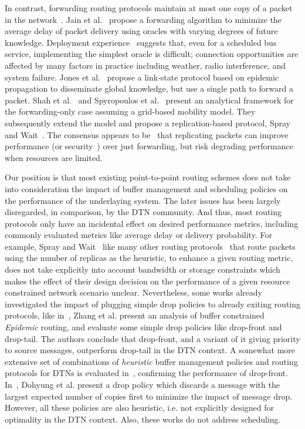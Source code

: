 In contrast, forwarding routing protocols maintain at most one copy of a packet in the network~\cite{Fall:DTNrouting,Waterloo:wdtn,akis:technical1}. Jain et
al.~\cite{Fall:DTNrouting} propose a forwarding algorithm to minimize the average delay of packet delivery using oracles with varying
degrees of future knowledge. Deployment experience~\cite{BalasubramanianLV07} suggests that, even for a scheduled bus service, implementing
the simplest oracle is difficult; connection opportunities are affected by many factors in practice including weather, radio
interference, and system failure. Jones et al.~\cite{Waterloo:wdtn} propose a link-state protocol based on
epidemic propagation to disseminate global knowledge, but use a single path to forward a packet. Shah et al.~\cite{Shah:datamules} and
Spyropoulos et al.~\cite{akis:technical1} present an analytical framework for
the forwarding-only case assuming a grid-based mobility model. They subsequently extend the model and propose a
replication-based protocol, Spray and Wait~\cite{akis:wdtn}. The consensus appears to be~\cite{akis:wdtn} that replicating packets can improve
performance (or security~\cite{Levine:Mobihoc07}) over just forwarding, but risk degrading performance when resources are limited.

Our position is that most existing point-to-point routing schemes does not take into consideration the impact of buffer management and scheduling policies on the performance of the underlaying system. The later issues has been largely disregarded, in comparison, by the DTN community. And thus, most routing protocols only have an incidental effect on desired performance metrics, including commonly evaluated metrics like average delay or delivery probability. For example, Spray and Wait~\cite{akis:wdtn} like many other routing protocols~\cite{Haas:wdtn,Vahdat:epidemic} that route packets using the number of replicas as the heuristic, to enhance a given routing metric, does not take explicitly into account bandwidth or storage constraints which makes the effect of their design decision on the performance of a given resource constrained network scenario unclear. Nevertheless, some works already investigated the impact of plugging simple drop policies to already exiting routing protocols, like in~\cite{Towsley:Epidemic}, Zhang et al. present an analysis of buffer constrained \emph{Epidemic} routing, and evaluate some simple drop policies like drop-front and drop-tail. The authors conclude that drop-front, and a variant of it giving priority to source messages, outperform drop-tail in the DTN context. A somewhat more extensive set of combinations of \emph{heuristic} buffer management policies and routing protocols for DTNs is evaluated in~\cite{QueuingPolicies}, confirming the performance of drop-front. In~\cite{DCopies}, Dohyung et al. present a drop policy which discards a message with the largest expected number of copies first to minimize the impact of message drop. However, all these policies are also heuristic, i.e. not explicitly designed for optimality in the DTN context. Also, these works do not address scheduling. 

